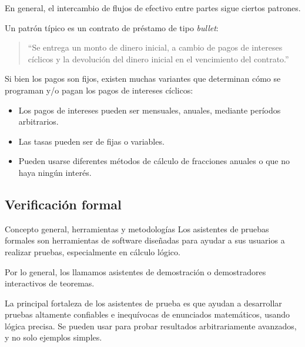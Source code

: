\documentclass{beamer}
\begin{document}
\begin{frame}
    En general, el intercambio de flujos de efectivo entre partes sigue ciertos patrones. \pause

    Un patrón típico es un contrato de préstamo de tipo \textit{bullet}: \pause

    \medskip

    \begin{quote}
        ``Se entrega un monto de dinero inicial, a cambio de pagos de intereses cíclicos y la devolución del dinero inicial en el vencimiento del contrato.''
    \end{quote}
    \pause
    \medskip

    Si bien los pagos son fijos, existen muchas variantes que determinan cómo se programan y/o pagan los pagos de intereses cíclicos:
    \begin{itemize}
        \pause
        \item Los pagos de intereses pueden ser mensuales, anuales, mediante períodos arbitrarios. 
        \pause
        \item Las tasas pueden ser de fijas o variables.
        \pause
        \item Pueden usarse diferentes métodos de cálculo de fracciones anuales o que no haya ningún interés.
    \end{itemize}



\end{frame}


\subsection{Verificación formal}

\begin{frame}{Concepto general, herramientas y metodologías}
Los asistentes de pruebas formales son herramientas de software diseñadas para ayudar a sus usuarios a realizar pruebas, especialmente en cálculo lógico.

\medskip

Por lo general, los llamamos asistentes de demostración o demostradores interactivos de teoremas.

\medskip
\pause

La principal fortaleza de los asistentes de prueba es que ayudan a desarrollar pruebas altamente confiables e inequívocas de enunciados matemáticos, usando lógica precisa. Se pueden usar para probar resultados arbitrariamente avanzados, y no solo ejemplos simples.

\end{frame}
\end{document}

